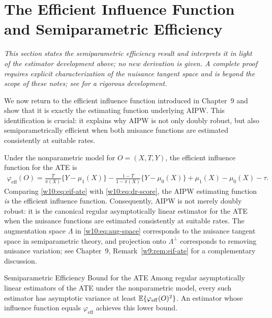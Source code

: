 \documentclass[master.tex]{subfiles}
\begin{document}
\section{The Efficient Influence Function and Semiparametric Efficiency}
\label{w10:sec:eif}

\emph{This section states the semiparametric efficiency result and
interprets it in light of the estimator development above; no new
derivation is given.  A complete proof requires explicit
characterization of the nuisance tangent space and is beyond the
scope of these notes; see \citet{tsiatis2006semiparametric} for a
rigorous development.}

\medskip

We now return to the efficient influence function introduced in
Chapter~9 and show that it is exactly the estimating function
underlying AIPW.  This identification is crucial: it explains why
AIPW is not only doubly robust, but also semiparametrically efficient
when both nuisance functions are estimated consistently at suitable
rates.

Under the nonparametric model for $O=(X,T,Y)$, the efficient
influence function for the ATE is
\begin{align}
  \varphi_{\mathrm{eff}}(O)
  = \frac{T}{\pi(X)}\{Y-\mu_1(X)\}
    - \frac{1-T}{1-\pi(X)}\{Y-\mu_0(X)\}
    + \mu_1(X) - \mu_0(X) - \tau.
  \label{w10:eq:eif-ate}
\end{align}
Comparing \eqref{w10:eq:eif-ate} with \eqref{w10:eq:dr-score}, the
AIPW estimating function \emph{is} the efficient influence function.
Consequently, AIPW is not merely doubly robust: it is the canonical
regular asymptotically linear estimator for the ATE when the nuisance
functions are estimated consistently at suitable rates.  The
augmentation space $\Lambda$ in \eqref{w10:eq:aug-space} corresponds
to the nuisance tangent space in semiparametric theory, and projection
onto $\Lambda^\perp$ corresponds to removing nuisance variation; see
Chapter~9, Remark~\ref{w9:rem:eif-ate} for a complementary
discussion.

\begin{thm}{Semiparametric Efficiency Bound for the ATE}
\label{w10:thm:bound}
Among regular asymptotically linear estimators of the ATE under the
nonparametric model, every such estimator has asymptotic variance at
least $\mathbb{E}\{\varphi_{\mathrm{eff}}(O)^2\}$.  An estimator whose
influence function equals $\varphi_{\mathrm{eff}}$ achieves this
lower bound.
\end{thm}
\end{document}
